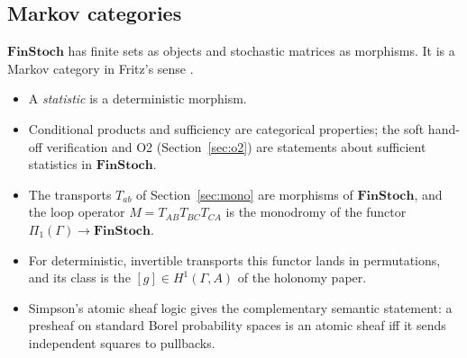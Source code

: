 \documentclass[11pt]{article}
\theoremstyle{definition}
\theoremstyle{remark}
\begin{document}
\subsection{Markov categories}
$\mathbf{FinStoch}$ has finite sets as objects and stochastic matrices as morphisms. It is a Markov category in Fritz's sense \cite{fritz}.
\begin{itemize}
  \item A \emph{statistic} is a deterministic morphism.
  \item Conditional products and sufficiency are categorical properties; the soft hand-off verification and O2 (Section~\ref{sec:o2}) are statements about sufficient statistics in $\mathbf{FinStoch}$.
  \item The transports $T_{ab}$ of Section~\ref{sec:mono} are morphisms of $\mathbf{FinStoch}$, and the loop operator $M=T_{AB}T_{BC}T_{CA}$ is the monodromy of the functor $\Pi_1(\Gamma)\to\mathbf{FinStoch}$.
  \item For deterministic, invertible transports this functor lands in permutations, and its class is the $[g]\in H^1(\Gamma,A)$ of the holonomy paper.
  \item Simpson's atomic sheaf logic \cite{simpson} gives the complementary semantic statement: a presheaf on standard Borel probability spaces is an atomic sheaf iff it sends independent squares to pullbacks.
\end{itemize}
\end{document}
